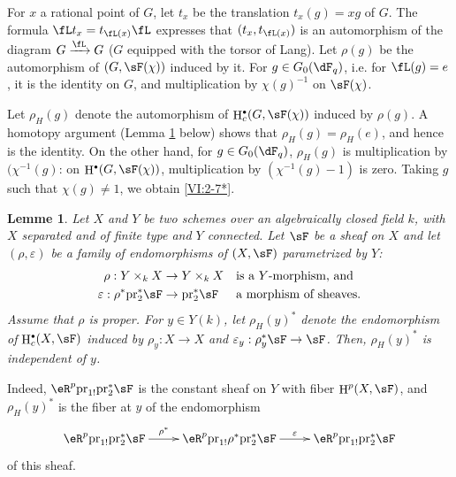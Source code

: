 \documentclass[oneside]{book}
\DeclareMathOperator{\h}{H}
\newcommand{\pr}{\mathrm{pr}} %
\theoremstyle{sga-source}
\theoremstyle{sga-source-dash}
\theoremstyle{sga-source-dotdash}
\theoremstyle{sga-source-number-note-dash}
\theoremstyle{sga-source-note-number-dotdash}
\theoremstyle{sga-source-example-dotdash}
\theoremstyle{sga-source-inline-number}
\theoremstyle{sga-source-bare-number}
\theoremstyle{sga-source}
\newtheorem{lemma_}[subsection]{Lemme}
\let\oldbullet\bullet
\renewcommand{\bullet}{\textnormal{\tiny$\oldbullet$}}
\newcommand{\PrintPage}[1]{}\newcommand{\MathPage}[1]{}\newcommand{\PrintCite}[2]{#1}\newcommand{\var}[3]{#1}
\begin{document}
For $x$ a rational point of $G$, let $t_x$ be the translation $t_x(g) = x g$ 
of $G$. The formula $\fL t_x = t_{\fL(x)} \fL$ expresses that $(t_x,t_{\fL(x)})$ 
is an automorphism of the diagram $G\xrightarrow\fL G$ ($G$ equipped with the torsor of 
Lang). Let $\rho(g)$ be the automorphism of $(G,\sF(\chi))$ induced by it. 
For $g\in G_0(\dF_q)$, i.e. for $\fL(g) = e$, it is the identity on $G$, and 
multiplication by $\chi(g)^{-1}$ on $\sF(\chi)$. 

Let $\rho_H(g)$ denote the automorphism of $\h_c^\bullet(G,\sF(\chi))$ induced by 
$\rho(g)$. A homotopy argument (Lemma \ref{VI:2-8} below) shows that 
$\rho_H(g) = \rho_H(e)$, and hence is the identity. On the other hand, for 
$g\in G_0(\dF_q)$, $\rho_H(g)$ is multiplication by 
$\var{(\chi^{-1}(g)}{\chi^{-1}(g)}{S45-SOL-0748}$: on $\var{\h^\bullet(G,\sF(\chi))}{\h_c^\bullet(G,\sF(\chi))}{S45-SOL-0749}$, multiplication by 
$(\chi^{-1}(g)-1)$ is zero. Taking $g$ such that $\chi(g)\ne 1$, we obtain 
\ref{VI:2-7*}. 





\begin{lemma_}\label{VI:2-8}
Let $X$ and $Y$ be two schemes over an algebraically closed field $k$, with $X$ 
separated and of finite type and $Y$ connected. Let $\sF$ be a sheaf on $X$ and 
let $(\rho,\varepsilon)$ be a family of endomorphisms of $(X,\sF)$ parametrized 
by $Y$: 
\begin{align*} 
  \rho:Y\times_k X &\to Y\times_k X && \text{is a $Y$-morphism, and} \\
  \varepsilon:\rho^\ast \pr_2^\ast \sF &\to \pr_2^\ast\sF && \text{a morphism of sheaves.} 
\end{align*}
Assume that $\rho$ is proper. For $y\in Y(k)$, let $\rho_H(y)^\ast$ denote 
the endomorphism of $\h_c^\bullet(X,\sF)$ induced by $\rho_y:X\to X$ and 
$\varepsilon_y:\rho_y^\ast\sF\to \sF$. Then, $\rho_H(y)^\ast$ is 
independent of $y$. 
\end{lemma_}

Indeed, $\eR^p \pr_{1!} \pr_2^\ast\sF$ is the 
constant sheaf on $Y$ with fiber \PrintPage{188}
$\var{\h^p(X,\sF)}{\h_c^p(X,\sF)}{S45-SOL-0750}$, and $\rho_H(y)^\ast$ is the 
fiber at $y$ of the endomorphism 
\[\xymatrix{
  \eR^p \pr_{1!} \pr_2^\ast \sF \ar[r]^-{\rho^\ast} 
    & \eR^p \pr_{1!} \rho^\ast \pr_2^\ast \sF \ar[r]^-\varepsilon 
    & \eR^p \pr_{1!} \pr_2^\ast \sF 
}\]
of this sheaf. 
\end{document}
